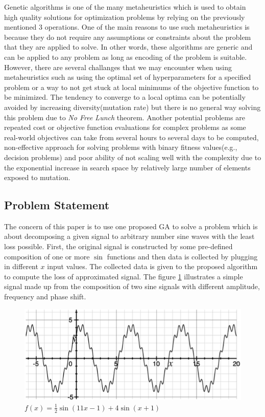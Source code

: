 \documentclass[conference]{IEEEtran}
\begin{document}
Genetic algorithms \cite{ga} is one of the many metaheuristics which is used to obtain high quality solutions for optimization problems by relying on the previously mentioned 3 operations. 
One of the main reasons to use such metaheuristics is because they do not require any assumptions or constraints about the problem that they are applied to solve. In other words, these algorithms 
are generic and can be applied to any problem as long as encoding of the problem is suitable. However, there are several challanges that we may encounter when using metaheuristics such as using 
the optimal set of hyperparameters for a specified problem or a way to not get stuck at local minimums of the objective function to be minimized. The tendency to converge to a local optima can 
be potentially avoided by increasing diversity(mutation rate) but there is no general way solving this problem due to \textit{No Free Lunch} theorem. Another potential problems are repeated 
cost or objective function evaluations for complex problems as some real-world objectives can take from several hours to several days to be computed, non-effective approach for solving problems 
with binary fitness values(e.g., decision problems) and poor ability of not scaling well with the complexity due to the exponential increase in search space by relatively large number of elements 
exposed to mutation.

\subsection{Problem Statement}
The concern of this paper is to use one proposed GA to solve a problem which is about decomposing a given signal to arbitrary number sine waves with the least loss possible. First, the original 
signal is constructed by some pre-defined composition of one or more $\sin$ functions and then data is collected by plugging in different $x$ input values. The collected data is given to the proposed 
algorithm to compute the loss of approximated signal. The figure \ref{fig:example} illustrates a simple signal made up from the composition of two sine signals with different amplitude, frequency 
and phase shift.

\begin{figure}[h]
	\centering
	\includegraphics[width=0.75\linewidth]{img/example.png}
	\caption{$f(x) = \frac{1}{2}\sin(11x-1) + 4\sin(x+1)$}
	\label{fig:example}
\end{figure}
\end{document}
